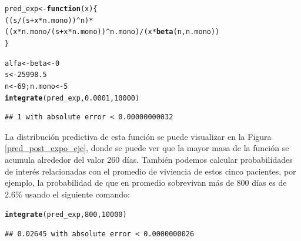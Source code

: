 \documentclass[10pt,openright]{book}\usepackage[]{graphicx}\usepackage[]{color}
\makeatletter
\newcommand{\hlnum}[1]{\textcolor[rgb]{0.686,0.059,0.569}{#1}}%
\newcommand{\hlopt}[1]{\textcolor[rgb]{0,0,0}{#1}}%
\newcommand{\hlstd}[1]{\textcolor[rgb]{0.345,0.345,0.345}{#1}}%
\newcommand{\hlkwa}[1]{\textcolor[rgb]{0.161,0.373,0.58}{\textbf{#1}}}%
\newcommand{\hlkwb}[1]{\textcolor[rgb]{0.69,0.353,0.396}{#1}}%
\newcommand{\hlkwc}[1]{\textcolor[rgb]{0.333,0.667,0.333}{#1}}%
\newcommand{\hlkwd}[1]{\textcolor[rgb]{0.737,0.353,0.396}{\textbf{#1}}}%
\newenvironment{kframe}{%
 \def\at@end@of@kframe{}%
 \ifinner\ifhmode%
  \def\at@end@of@kframe{\end{minipage}}%
  \begin{minipage}{\columnwidth}%
 \fi\fi%
 \def\FrameCommand##1{\hskip\@totalleftmargin \hskip-\fboxsep
 \colorbox{shadecolor}{##1}\hskip-\fboxsep
     \hskip-\linewidth \hskip-\@totalleftmargin \hskip\columnwidth}%
 \MakeFramed {\advance\hsize-\width
   \@totalleftmargin\z@ \linewidth\hsize
   \@setminipage}}%
 {\par\unskip\endMakeFramed%
 \at@end@of@kframe}
\newenvironment{knitrout}{}{} %
\makeatother
\begin{document}
\begin{Eje}
\begin{knitrout}
\color{fgcolor}\begin{kframe}
\begin{alltt}
\hlstd{pred_exp}\hlkwb{<-}\hlkwa{function}\hlstd{(}\hlkwc{x}\hlstd{)\{}
\hlstd{((s}\hlopt{/}\hlstd{(s}\hlopt{+}\hlstd{x}\hlopt{*}\hlstd{n.mono))}\hlopt{^}\hlstd{n)}\hlopt{*}\hlstd{((x}\hlopt{*}\hlstd{n.mono}\hlopt{/}\hlstd{(s}\hlopt{+}\hlstd{x}\hlopt{*}\hlstd{n.mono))}\hlopt{^}\hlstd{n.mono)}\hlopt{/}\hlstd{(x}\hlopt{*}\hlkwd{beta}\hlstd{(n,n.mono))}
\hlstd{\}}

\hlstd{alfa}\hlkwb{<-}\hlstd{beta}\hlkwb{<-}\hlnum{0}
\hlstd{s}\hlkwb{<-}\hlnum{25998.5}
\hlstd{n}\hlkwb{<-}\hlnum{69}\hlstd{; n.mono}\hlkwb{<-}\hlnum{5}
\hlkwd{integrate}\hlstd{(pred_exp,} \hlnum{0.0001}\hlstd{,} \hlnum{10000}\hlstd{)}
\end{alltt}
\begin{verbatim}
## 1 with absolute error < 0.00000000032
\end{verbatim}
\end{kframe}
\end{knitrout}
    La distribuci\'on predictiva de esta funci\'on se puede visualizar en la Figura \ref{pred_post_expo_eje}, donde se puede ver que la mayor masa de la funci\'on se acumula alrededor del valor 260 d\'ias. Tambi\'en podemos calcular probabilidades de inter\'es relacionadas con el promedio de viviencia de estos cinco pacientes, por ejemplo, la probabilidad de que en promedio sobrevivan m\'as de 800 d\'ias es de 2.6\% usando el siguiente comando:
\begin{knitrout}
\color{fgcolor}\begin{kframe}
\begin{alltt}
\hlkwd{integrate}\hlstd{(pred_exp,}\hlnum{800}\hlstd{,}\hlnum{10000}\hlstd{)}
\end{alltt}
\begin{verbatim}
## 0.02645 with absolute error < 0.0000000026
\end{verbatim}
\end{kframe}
\end{knitrout}
    \end{Eje}
    
\end{document}
